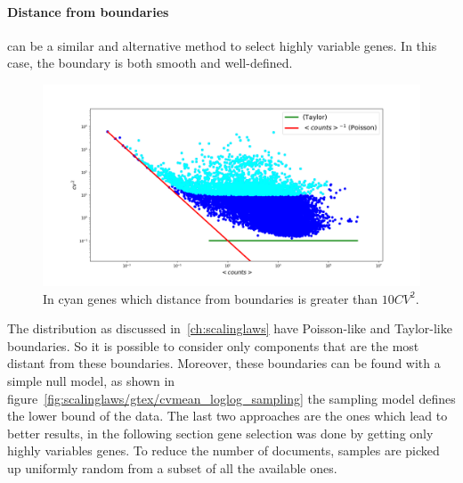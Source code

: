\paragraph{Distance from boundaries} can be a similar and alternative method to select highly variable genes. In this case, the boundary is both smooth and well-defined.
\begin{figure}[htb!]
    \centering
    \includegraphics[width=0.8\linewidth]{pictures/topic/cvmean_oversampling.png}
    \caption{In \textcolor{pythoncyan}{cyan} genes which distance from boundaries is greater than $10 CV^2$.}
    \label{fig:topic/cvmean_oversampling}
\end{figure}
The distribution as discussed in~\ref{ch:scalinglaws} have Poisson-like and Taylor-like boundaries. So it is possible to consider only components that are the most distant from these boundaries. Moreover, these boundaries can be found with a simple null model, as shown in figure~\ref{fig:scalinglaws/gtex/cvmean_loglog_sampling} the sampling model defines the lower bound of the data.
\FloatBarrier
The last two approaches are the ones which lead to better results, in the following section gene selection was done by getting only highly variables genes.
To reduce the number of documents, samples are picked up uniformly random from a subset of all the available ones.